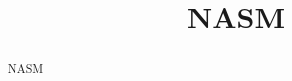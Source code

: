 \documentclass[11pt,twocolumn]{article}
\begin{document}
\title{NASM}
\maketitle{}
\begin{abstract}NASM
\end{abstract}
\vspace{1em}







\end{document}
